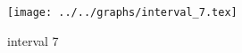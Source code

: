 \begin{figure}[h] \centering\texttt{[image: ../../graphs/interval\_7.tex]}\caption{interval 7}\label{gr:interval_7} \end{figure}
